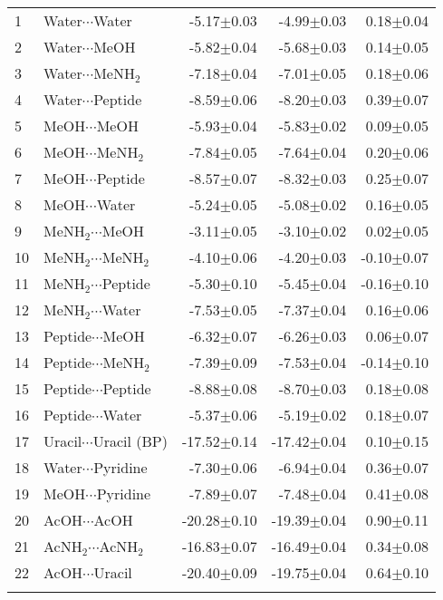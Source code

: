 \begin{longtable}{llrrr}
1 & Water$\cdots$Water & -5.17$\pm$0.03 & -4.99$\pm$0.03 & 0.18$\pm$0.04  \\
2 & Water$\cdots$MeOH & -5.82$\pm$0.04 & -5.68$\pm$0.03 & 0.14$\pm$0.05  \\
3 & Water$\cdots$MeNH$_2$ & -7.18$\pm$0.04 & -7.01$\pm$0.05 & 0.18$\pm$0.06  \\
4 & Water$\cdots$Peptide & -8.59$\pm$0.06 & -8.20$\pm$0.03 & 0.39$\pm$0.07  \\
5 & MeOH$\cdots$MeOH & -5.93$\pm$0.04 & -5.83$\pm$0.02 & 0.09$\pm$0.05  \\
6 & MeOH$\cdots$MeNH$_2$ & -7.84$\pm$0.05 & -7.64$\pm$0.04 & 0.20$\pm$0.06  \\
7 & MeOH$\cdots$Peptide & -8.57$\pm$0.07 & -8.32$\pm$0.03 & 0.25$\pm$0.07  \\
8 & MeOH$\cdots$Water & -5.24$\pm$0.05 & -5.08$\pm$0.02 & 0.16$\pm$0.05  \\
9 & MeNH$_2$$\cdots$MeOH & -3.11$\pm$0.05 & -3.10$\pm$0.02 & 0.02$\pm$0.05  \\
10 & MeNH$_2$$\cdots$MeNH$_2$ & -4.10$\pm$0.06 & -4.20$\pm$0.03 & -0.10$\pm$0.07  \\
11 & MeNH$_2$$\cdots$Peptide & -5.30$\pm$0.10 & -5.45$\pm$0.04 & -0.16$\pm$0.10  \\
12 & MeNH$_2$$\cdots$Water & -7.53$\pm$0.05 & -7.37$\pm$0.04 & 0.16$\pm$0.06  \\
13 & Peptide$\cdots$MeOH & -6.32$\pm$0.07 & -6.26$\pm$0.03 & 0.06$\pm$0.07  \\
14 & Peptide$\cdots$MeNH$_2$ & -7.39$\pm$0.09 & -7.53$\pm$0.04 & -0.14$\pm$0.10  \\
15 & Peptide$\cdots$Peptide & -8.88$\pm$0.08 & -8.70$\pm$0.03 & 0.18$\pm$0.08  \\
16 & Peptide$\cdots$Water & -5.37$\pm$0.06 & -5.19$\pm$0.02 & 0.18$\pm$0.07  \\
17 & Uracil$\cdots$Uracil (BP) & -17.52$\pm$0.14 & -17.42$\pm$0.04 & 0.10$\pm$0.15  \\
18 & Water$\cdots$Pyridine & -7.30$\pm$0.06 & -6.94$\pm$0.04 & 0.36$\pm$0.07  \\
19 & MeOH$\cdots$Pyridine & -7.89$\pm$0.07 & -7.48$\pm$0.04 & 0.41$\pm$0.08  \\
20 & AcOH$\cdots$AcOH & -20.28$\pm$0.10 & -19.39$\pm$0.04 & 0.90$\pm$0.11  \\
21 & AcNH$_2$$\cdots$AcNH$_2$ & -16.83$\pm$0.07 & -16.49$\pm$0.04 & 0.34$\pm$0.08  \\
22 & AcOH$\cdots$Uracil & -20.40$\pm$0.09 & -19.75$\pm$0.04 & 0.64$\pm$0.10  \\
$$
\end{longtable}
